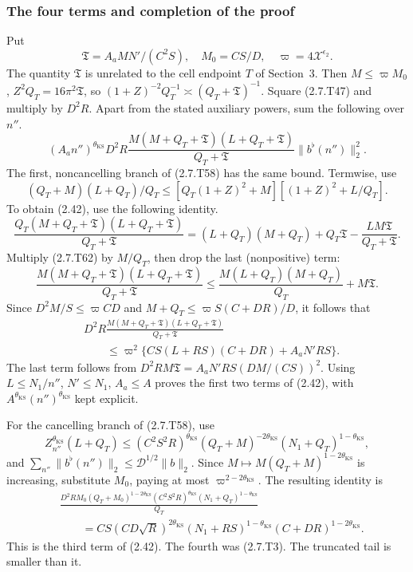\subsubsection{The four terms and completion of the proof}

Put
\[
\mathfrak T=A_aMN'/(C^2S),\quad M_0=CS/D,\quad
\varpi=4\mathcal X^{\epsilon_2}.
\tag{2.7.T59}\label{p1:eq:2.7.T59}
\]
The quantity $\mathfrak T$ is unrelated to the cell endpoint $T$ of
Section~3. Then $M\le\varpi M_0$,
$Z^2Q_T=16\pi^2\mathfrak T$, so
$(1+Z)^{-2}Q_T^{-1}\asymp(Q_T+\mathfrak T)^{-1}$.
Square (2.7.T47) and multiply by $D^2R$. Apart from the stated auxiliary powers, sum the following over $n''$.
\[
(A_an'')^{\theta_{\mathrm{KS}}} D^2R
 \frac{M(M+Q_T+\mathfrak T)(L+Q_T+\mathfrak T)}
                       {Q_T+\mathfrak T}\|b^\flat(n'')\|_2^2.
\tag{2.7.T60}\label{p1:eq:2.7.T60}
\]
The first, noncancelling branch of (2.7.T58) has the same bound. Termwise, use
\[
(Q_T+M)(L+Q_T)/Q_T
 \le[Q_T(1+Z)^2+M][(1+Z)^2+L/Q_T].
\tag{2.7.T61}\label{p1:eq:2.7.T61}
\]
To obtain (2.42), use the following identity.
\[
\frac{Q_T(M+Q_T+\mathfrak T)(L+Q_T+\mathfrak T)}
                            {Q_T+\mathfrak T}
=(L+Q_T)(M+Q_T)+Q_T\mathfrak T
                         -\frac{LM\mathfrak T}{Q_T+\mathfrak T}.
\tag{2.7.T62}\label{p1:eq:2.7.T62}
\]
Multiply (2.7.T62) by $M/Q_T$, then drop the last (nonpositive) term:
\[
\frac{M(M+Q_T+\mathfrak T)(L+Q_T+\mathfrak T)}{Q_T+\mathfrak T}
\le\frac{M(L+Q_T)(M+Q_T)}{Q_T}+M\mathfrak T.
\]
Since
$D^2M/S\le\varpi CD$ and
$M+Q_T\le\varpi S(C+DR)/D$, it follows that
\[
\begin{aligned}
&D^2R\frac{M(M+Q_T+\mathfrak T)(L+Q_T+\mathfrak T)}
                            {Q_T+\mathfrak T}\\
&\qquad\le\varpi^2
 \{CS(L+RS)(C+DR)+A_aN'RS\}.
\end{aligned}
\tag{2.7.T63}\label{p1:eq:2.7.T63}
\]
The last term follows from
$D^2RM\mathfrak T=A_aN'RS(DM/(CS))^2$.
Using $L\le N_1/n''$, $N'\le N_1$, $A_a\le A$ proves
the first two terms of (2.42), with
$A^{\theta_{\mathrm{KS}}}(n'')^{\theta_{\mathrm{KS}}}$ kept explicit.

For the cancelling branch of (2.7.T58), use
\[
Z_{n''}^{\theta_{\mathrm{KS}}}(L+Q_T)
 \le(C^2S^2R)^{\theta_{\mathrm{KS}}}(Q_T+M)^{-2\theta_{\mathrm{KS}}}(N_1+Q_T)^{1-\theta_{\mathrm{KS}}},
\tag{2.7.T64}\label{p1:eq:2.7.T64}
\]
and $\sum_{n''}\|b^\flat(n'')\|_2
\le\mathcal D^{1/2}\|b\|_2$. Since
$M\mapsto M(Q_T+M)^{1-2\theta_{\mathrm{KS}}}$ is increasing,
substitute $M_0$, paying at most $\varpi^{2-2\theta_{\mathrm{KS}}}$.
The resulting identity is
\[
\begin{aligned}
&\frac{D^2RM_0(Q_T+M_0)^{1-2\theta_{\mathrm{KS}}}
                  (C^2S^2R)^{\theta_{\mathrm{KS}}}(N_1+Q_T)^{1-\theta_{\mathrm{KS}}}}{Q_T}\\
&\qquad=CS(CD\sqrt R)^{2\theta_{\mathrm{KS}}}
             (N_1+RS)^{1-\theta_{\mathrm{KS}}}(C+DR)^{1-2\theta_{\mathrm{KS}}}.
\end{aligned}
\tag{2.7.T65}\label{p1:eq:2.7.T65}
\]
This is the third term of (2.42). The fourth was (2.7.T3).
The truncated tail is smaller than it.

